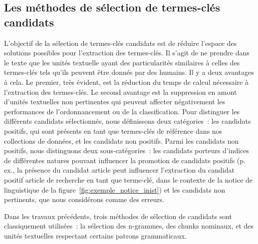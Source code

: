     \subsection{Les méthodes de sélection de termes-clés candidats}
    \label{sec:selection}
      L'objectif de la sélection de termes-clés candidats est de réduire
      l'espace des solutions possibles pour l'extraction des termes-clés. Il
      s'agit de ne prendre dans le texte que les unités textuelle ayant des
      particularités similaires à celles des termes-clés tels qu'ils peuvent
      être donnés par des humains. Il y a deux avantages à cela. Le premier,
      très évident, est la réduction du temps de calcul nécessaire à
      l'extraction des termes-clés. Le second avantage est la suppression en
      amont d'unités textuelles non pertinentes qui peuvent affecter
      négativement les performances de l'ordonnancement ou de la classification.
      Pour distinguer les différents candidats sélectionnés, nous définissons
      deux catégories~: les candidats positifs, qui sont présents en tant que
      termes-clés de référence dans nos collections de données, et les candidats
      non positifs. Parmi les candidats non positifs, nous distinguons deux
      sous-catégories~: les candidats porteurs d'indices de différentes natures
      pouvant influencer la promotion de candidats positifs (p. ex., la présence
      du candidat \og{}article\fg{} peut influencer l'extraction du candidat
      positif \og{}article de recherche\fg{} en tant que terme-clé, dans le
      contexte de la notice de linguistique de la
      figure~\ref{fig:exemple_notice_inist}) et les candidats non pertinents,
      que nous considérons comme des erreurs.

      Dans les travaux précédents, trois méthodes de sélection de candidats sont
      classiquement utilisées~: la sélection des n-grammes, des chunks nominaux,
      et des unités textuelles respectant certains patrons grammaticaux.

